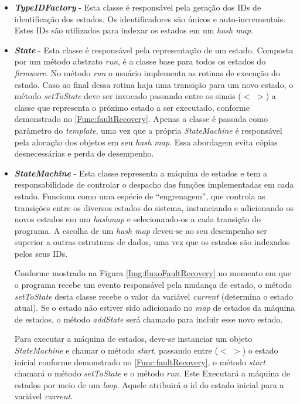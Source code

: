 \begin{itemize}
	\item \textit{\textbf{TypeIDFactory}} - Esta classe é responsável pela geração dos IDs de identificação dos estados. Os identificadores são únicos e auto-incrementais. Estes IDs são utilizados para indexar os estados em um \textit{hash map}.
	
	\item \textit{\textbf{State}} - Esta classe é responsável pela representação de um estado. Composta por um método abstrato \textit{run}, é a classe base para todos os estados do \textit{firmware}. No método \textit{run} o usuário implementa as rotinas de execução do estado. Caso ao final dessa rotina haja uma transição para um novo estado, o método \textit{setToState} deve ser invocado passando entre os sinais ($<$ $>$) a classe que representa o próximo estado a ser executado, conforme demonstrado no \autoref{Func:faultRecovery}. Apenas a classe é passada como parâmetro do \textit{template}, uma vez que a própria \textit{StateMachine} é responsável pela alocação dos objetos em seu \textit{hash map}. Essa abordagem evita cópias desnecessárias e perda de desempenho.
	
	\item \textit{\textbf{StateMachine}} - Esta classe representa a máquina de estados e tem a responsabilidade de controlar o despacho das funções implementadas em cada estado. Funciona como uma espécie de ``engrenagem'', que controla as transições entre os diversos estados do sistema, instanciando e adicionando os novos estados em um \textit{hashmap} e selecionando-os a cada transição do programa. A escolha de um \textit{hash map} deveu-se ao seu desempenho ser superior a outras estruturas de dados, uma vez que os estados são indexados pelos seus IDs.
	
	Conforme mostrado na Figura \ref{Img:fluxoFaultRecovery} no momento em que o programa recebe um evento responsável pela mudança de estado, o método \textit{setToState} desta classe recebe o valor da variável \textit{current} (determina o estado atual). Se o estado não estiver sido adicionado no \textit{map} de estados da máquina de estados, o método \textit{addState} será chamado para incluir esse novo estado.
	
	 Para executar a máquina de estados, deve-se instanciar um objeto \textit{StateMachine} e chamar o método \textit{start}, passando entre ($<$ $>$) o estado inicial conforme demonstrado no \autoref{Func:faultRecovery}, o método \textit{start} chamará o método \textit{setToState} e o método \textit{run}. Este Executará a máquina de estados por meio de um \textit{loop}. Aquele atribuirá o id do estado inicial para a variável \textit{current}.
		
\end{itemize}

